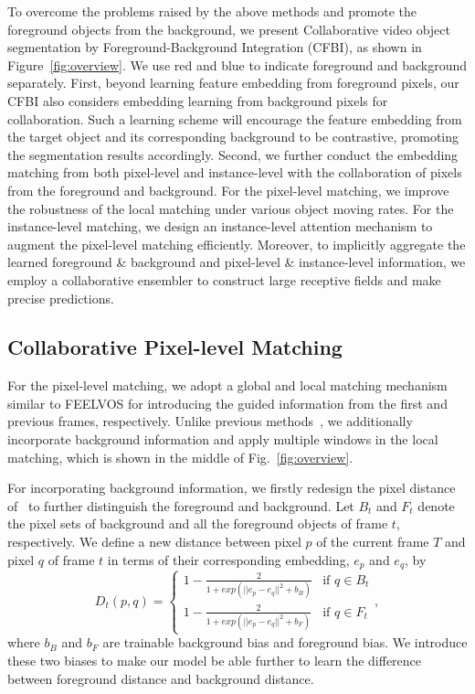 \documentclass[runningheads]{llncs}
\begin{document}
To overcome the problems raised by the above methods and promote the foreground objects from the background, we present Collaborative video object segmentation by Foreground-Background Integration (CFBI), as shown in Figure~\ref{fig:overview}. We use red and blue to indicate foreground and background separately. First, beyond learning feature embedding from foreground pixels, our CFBI also considers embedding learning from background pixels for collaboration. Such a learning scheme will encourage the feature embedding from the target object and its corresponding background to be contrastive, promoting the segmentation results accordingly. Second, we further conduct the embedding matching from both pixel-level and instance-level with the collaboration of pixels from the foreground and background. For the pixel-level matching, 
we improve the robustness of the local matching under various object moving rates. For the instance-level matching, we design an instance-level attention mechanism to augment the pixel-level matching efficiently. Moreover, to implicitly aggregate the learned foreground \& background and pixel-level \& instance-level information, we employ a collaborative ensembler to construct large receptive fields and make precise predictions.



\subsection{Collaborative Pixel-level Matching}

For the pixel-level matching, we adopt a global and local matching mechanism similar to FEELVOS for introducing the guided information from the first and previous frames, respectively. Unlike previous methods~\cite{pml,feelvos}, we additionally incorporate background information and apply multiple windows in the local matching, which is shown in the middle of Fig.~\ref{fig:overview}. 

For incorporating background information, we firstly redesign the pixel distance of~\cite{feelvos} to further distinguish the foreground and background.
Let $B_t$ and $F_t$ denote the pixel sets of background and all the foreground objects of frame $t$, respectively. We define a new distance between pixel $p$ of the current frame $T$ and pixel $q$ of frame $t$ in terms of their corresponding embedding, $e_p$ and $e_q$, by
\begin{equation} \label{equ:distance}
    D_t(p,q)=
        \begin{cases}
            1-\frac{2}{1+exp(||e_p-e_q||^2+b_B)} & \text{if } q \in B_t\\
            1-\frac{2}{1+exp(||e_p-e_q||^2+b_F)} & \text{if } q \in F_t
        \end{cases},
\end{equation}
where $b_B$ and $b_F$ are trainable background bias and foreground bias. We introduce these two biases to make our model be able further to learn the difference between foreground distance and background distance.
\end{document}

